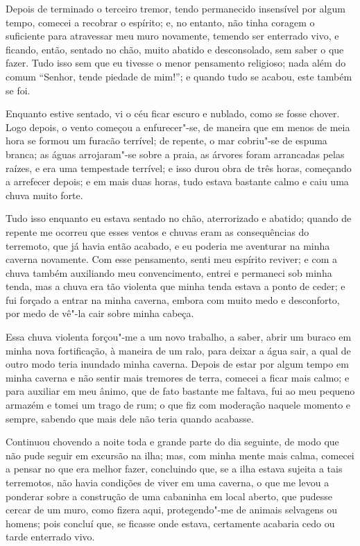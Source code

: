 Depois de terminado o terceiro tremor, tendo permanecido insensível por
algum tempo, comecei a recobrar o espírito; e, no entanto, não tinha
coragem o suficiente para atravessar meu muro novamente, temendo ser
enterrado vivo, e ficando, então, sentado no chão, muito abatido e
desconsolado, sem saber o que fazer. Tudo isso sem que eu tivesse o
menor pensamento religioso; nada além do comum ``Senhor, tende piedade
de mim!''; e quando tudo se acabou, este também se foi.

Enquanto estive sentado, vi o céu ficar escuro e nublado, como se fosse
chover. Logo depois, o vento começou a enfurecer"-se, de maneira que em
menos de meia hora se formou um furacão terrível; de repente, o mar
cobriu"-se de espuma branca; as águas arrojaram"-se sobre a praia, as
árvores foram arrancadas pelas raízes, e era uma tempestade terrível; e
isso durou obra de três horas, começando a arrefecer depois; e em mais
duas horas, tudo estava bastante calmo e caiu uma chuva muito forte.

Tudo isso enquanto eu estava sentado no chão, aterrorizado e abatido;
quando de repente me ocorreu que esses ventos e chuvas eram as
consequências do terremoto, que já havia então acabado, e eu poderia me
aventurar na minha caverna novamente. Com esse pensamento, senti meu
espírito reviver; e com a chuva também auxiliando meu convencimento,
entrei e permaneci sob minha tenda, mas a chuva era tão violenta que
minha tenda estava a ponto de ceder; e fui forçado a entrar na minha
caverna, embora com muito medo e desconforto, por medo de vê"-la cair
sobre minha cabeça.

Essa chuva violenta forçou"-me a um novo trabalho, a saber, abrir um
buraco em minha nova fortificação, à maneira de um ralo, para deixar a
água sair, a qual de outro modo teria inundado minha caverna. Depois de
estar por algum tempo em minha caverna e não sentir mais tremores de
terra, comecei a ficar mais calmo; e para auxiliar em meu ânimo, que de
fato bastante me faltava, fui ao meu pequeno armazém e tomei um trago de
rum; o que fiz com moderação naquele momento e sempre, sabendo que mais
dele não teria quando acabasse.

Continuou chovendo a noite toda e grande parte do dia seguinte, de modo
que não pude seguir em excursão na ilha; mas, com minha mente mais
calma, comecei a pensar no que era melhor fazer, concluindo que, se a
ilha estava sujeita a tais terremotos, não havia condições de viver em
uma caverna, o que me levou a ponderar sobre a construção de uma
cabaninha em local aberto, que pudesse cercar de um muro, como fizera
aqui, protegendo"-me de animais selvagens ou homens; pois concluí que, se
ficasse onde estava, certamente acabaria cedo ou tarde enterrado vivo.

